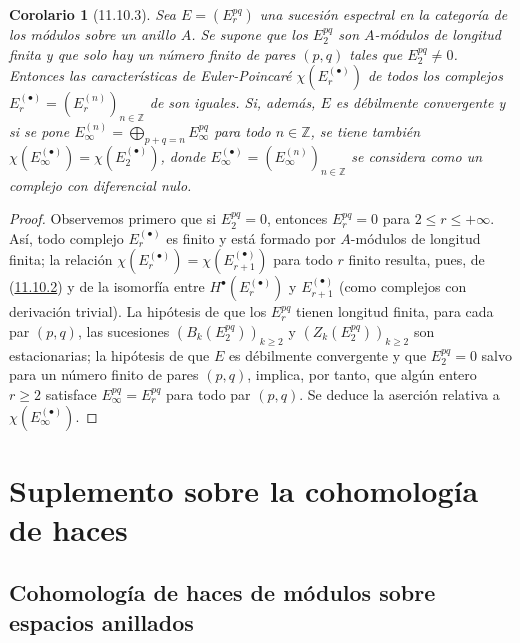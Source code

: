 \documentclass[10pt,oneside,openany]{book}
\theoremstyle{egaenv}\newtheorem*{env}{---}
\theoremstyle{egastatement}
\newtheorem*{corollary}{Corolario}
\theoremstyle{egadescription}
\renewcommand{\leq}{\leqslant}
\renewcommand{\geq}{\geqslant}
\begin{document}
\begin{corollary}[11.10.3]
\label{0.11.10.3}
\label{0.11.10.3-fr}
Sea $E=(E_r^{pq})$ una sucesión espectral en la
categoría de los módulos sobre un anillo $A$.
Se supone que los $E_2^{pq}$ son $A$-módulos de longitud finita y que solo hay un número finito de pares $(p,q)$ tales que $E_2^{pq}\neq0$. Entonces las características de Euler-Poincaré
$\chi(E_r^{(\bullet)})$
de todos los complejos
$E_r^{(\bullet)}=(E_r^{(n)})_{n\in\mathbb Z}$
de  son iguales.
Si, además, $E$ es débilmente convergente y si se pone $E_\infty^{(n)}=\bigoplus_{p+q=n}E_\infty^{pq}$ para todo $n\in\mathbb Z$, se tiene también $\chi(E_\infty^{(\bullet)})=\chi(E_2^{(\bullet)})$,
donde
$E_\infty^{(\bullet)}=(E_\infty^{(n)})_{n\in\mathbb Z}$
se considera como un complejo con diferencial nulo.
\end{corollary}

\begin{proof}
Observemos primero que si $E_2^{pq}=0$, entonces
$E_r^{pq}=0$ para $2\leq r\leq+\infty$.
Así, todo complejo $E_r^{(\bullet)}$ es finito y está formado por
$A$-módulos de longitud finita; la relación $\chi(E_r^{(\bullet)})=\chi(E_{r+1}^{(\bullet)})$ para todo $r$ finito resulta, pues, de (\hyperref[0.11.10.2-fr]{11.10.2}) y de la isomorfía entre $H^\bullet(E_r^{(\bullet)})$ y $E_{r+1}^{(\bullet)}$ (como complejos con derivación trivial). La hipótesis de que los $E_r^{pq}$ tienen longitud finita, para cada par
$(p,q)$, las sucesiones $(B_k(E_2^{pq}))_{k\geq2}$ y $(Z_k(E_2^{pq}))_{k\geq2}$ son estacionarias; la hipótesis de que $E$ es débilmente convergente y que $E_2^{pq}=0$ salvo para un número finito de pares $(p,q)$, implica, por tanto,
que algún entero $r\geq2$ satisface
$E_\infty^{pq}=E_r^{pq}$
para todo par $(p,q)$.
Se deduce la aserción relativa a
$\chi(E_\infty^{(\bullet)})$.
\end{proof}



\section{Suplemento sobre la cohomología de haces}
\label{section:0.12}
\label{section:0.12-fr}

\subsection{Cohomología de haces de módulos sobre espacios anillados}
\label{subsection:0.12.1}
\label{subsection:0.12.1-fr}
\end{document}
